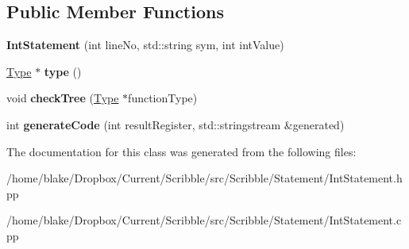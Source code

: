 \subsection*{Public Member Functions}
\begin{DoxyCompactItemize}
\item 
\hypertarget{class_scribble_core_1_1_int_statement_a275f9984bf4feb27e7735edc8cbbbcbe}{{\bfseries Int\-Statement} (int line\-No, std\-::string sym, int int\-Value)}\label{class_scribble_core_1_1_int_statement_a275f9984bf4feb27e7735edc8cbbbcbe}

\item 
\hypertarget{class_scribble_core_1_1_int_statement_a2540aa15838b2a60ca2dbd943a342e83}{\hyperlink{class_scribble_core_1_1_type}{Type} $\ast$ {\bfseries type} ()}\label{class_scribble_core_1_1_int_statement_a2540aa15838b2a60ca2dbd943a342e83}

\item 
\hypertarget{class_scribble_core_1_1_int_statement_afad23b037601e53524726f56b97c4fab}{void {\bfseries check\-Tree} (\hyperlink{class_scribble_core_1_1_type}{Type} $\ast$function\-Type)}\label{class_scribble_core_1_1_int_statement_afad23b037601e53524726f56b97c4fab}

\item 
\hypertarget{class_scribble_core_1_1_int_statement_a8705897a8243888d434b1cc658f5a92e}{int {\bfseries generate\-Code} (int result\-Register, std\-::stringstream \&generated)}\label{class_scribble_core_1_1_int_statement_a8705897a8243888d434b1cc658f5a92e}

\end{DoxyCompactItemize}


The documentation for this class was generated from the following files\-:\begin{DoxyCompactItemize}
\item 
/home/blake/\-Dropbox/\-Current/\-Scribble/src/\-Scribble/\-Statement/Int\-Statement.\-hpp\item 
/home/blake/\-Dropbox/\-Current/\-Scribble/src/\-Scribble/\-Statement/Int\-Statement.\-cpp\end{DoxyCompactItemize}
